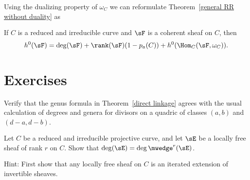 Using the dualizing property of $\omega_C$ we can reformulate Theorem~\ref{general RR without duality} as
\begin{theorem}\label{general RR with duality}
If $C$ is a reduced and irreducible curve and $\sF$ is a coherent sheaf on $C$, then
$$
h^0(\sF) = \deg(\sF) + \rank(\sF)(1-p_a(C)) + h^0(\Hom_C(\sF, \omega_C)).
$$
\end{theorem}



\section{Exercises}

\begin{exercise}
 Verify that the genus formula in Theorem~\ref{direct linkage} agrees with the usual calculation of degrees and genera for divisors on a quadric of
 classes $(a,b)$ and $(d-a, d-b)$.
\end{exercise}

\begin{exercise}
 Let $C$ be a reduced and irreducible projective curve, and let $\sE$ be a locally free sheaf of rank $r$ on $C$. Show that
 $\deg(\sE) = \deg\mwedge^r(\sE)$.
 
 Hint: First show that any locally free sheaf on $C$ is an iterated extension of invertible sheaves.
\end{exercise}

